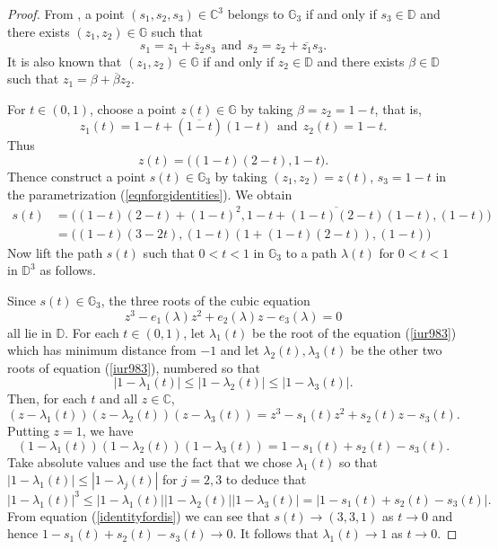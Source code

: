 \documentclass[11pt, reqno]{amsart}
\newcommand\1{\boldsymbol {1}}
\numberwithin{equation}{section}
\begin{document}
\begin{proof}
 From \cite{characterizationspoly}, a point $(s_{1},s_{2},s_{3})\in\mathbb{C}^{3}$ belongs to $\mathbb{G}_{3}$ if and only if $s_{3}\in\mathbb{D}$ and there exists $(z_{1},z_{2})\in\mathbb{G}$ such that 
\begin{equation}\label{eqnforgidentities}
    s_{1}=z_{1}+\overline{z}_{2}s_{3}~~\text{and}~~s_{2}=z_{2}+\overline{z_{1}}s_{3}.
\end{equation}
It is also known that $(z_{1},z_{2})\in\mathbb{G}$ if and only if $z_{2}\in\mathbb{D}$ and there exists $\beta\in\mathbb{D}$ such that $z_{1}=\beta+\overline{\beta}z_{2}$.

 For $t\in(0,1)$, choose a point $z(t)\in\mathbb{G}$ by taking $\beta=z_{2}=1-t$, that is, 
$$z_{1}(t) = 1-t+(\overline{1-t})(1-t)~~\text{and}~~z_{2}(t)=1-t.$$ 
Thus
$$z(t) = \bigg((1-t)(2-t),1-t\bigg).$$
Thence construct a point $s(t)\in\mathbb{G}_{3}$ by taking $(z_{1},z_{2})=z(t)$, $s_{3}=1-t$ in the parametrization (\ref{eqnforgidentities}). We obtain
\begin{align}
    s(t) &= \bigg((1-t)(2-t)+(1-t)^{2},1-t+\overline{(1-t)(2-t)}(1-t),(1-t)\bigg)\nonumber\\
    &=\bigg((1-t)(3-2t),(1-t)(1+(1-t)(2-t)),(1-t)\bigg)\label{identityfordis}
\end{align}
Now lift the path $s(t)$ such that $0<t<1$ in $\mathbb{G}_{3}$ to a path $\lambda(t)$ for $0<t<1$ in $\mathbb{D}^{3}$ as follows.

 Since $s(t)\in\mathbb{G}_{3}$, the three roots of the cubic equation 
\begin{equation}\label{iur983}
    z^{3}-e_{1}(\lambda)z^{2}+e_{2}(\lambda)z-e_{3}(\lambda)=0
\end{equation}
all lie in $\mathbb{D}$. For each $t\in(0,1)$, let $\lambda_{1}(t)$ be the root of the equation (\ref{iur983}) which has minimum distance from $-1$ and let $\lambda_{2}(t), \lambda_{3}(t)$ be the other two roots of equation (\ref{iur983}), numbered so that 
\begin{equation}\label{numberedinequality}
|1-\lambda_{1}(t)|\leq |1-\lambda_{2}(t)|\leq|1-\lambda_{3}(t)|.
\end{equation}
Then, for each $t$ and all $z\in\mathbb{C}$,
\begin{equation}\label{cubictings}
(z-\lambda_{1}(t))(z-\lambda_{2}(t))(z-\lambda_{3}(t))=z^{3}-s_{1}(t)z^{2}+s_{2}(t)z-s_{3}(t).
\end{equation}
Putting $z=1$, we have
$$(1-\lambda_{1}(t))(1-\lambda_{2}(t))(1-\lambda_{3}(t))=1-s_{1}(t)+s_{2}(t)-s_{3}(t).$$
Take absolute values and use the fact that we chose $\lambda_{1}(t)$ so that $|1-\lambda_{1}(t)|\leq |1-\lambda_{j}(t)|$ for $j=2,3$ to deduce that 
$$|1-\lambda_{1}(t)|^{3}\leq |1-\lambda_{1}(t)||1-\lambda_{2}(t)||1-\lambda_{3}(t)|=|1-s_{1}(t)+s_{2}(t)-s_{3}(t)|.$$
From equation (\ref{identityfordis}) we can see that $s(t)\rightarrow (3,3,1)$ as $t\rightarrow 0$ and hence $1-s_{1}(t)+s_{2}(t)-s_{3}(t)\rightarrow 0$. It follows that $\lambda_{1}(t)\rightarrow 1$ as $t\rightarrow 0$. 


\end{proof}
\end{document}
